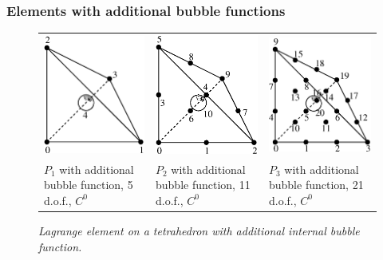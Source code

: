 \documentclass[11pt,a4paper]{article}
\begin{document}
\subsubsection{Elements with additional bubble functions}
\begin{figure}[H]
  \begin{center}
    \begin{tabular}{m{5cm}m{5cm}m{5cm}}
      \includegraphics[width=4.5cm,angle=0]{getfemlist_tetrahedron_P1_bubble.eps} & \includegraphics[width=4.5cm,angle=0]{getfemlist_tetrahedron_P2_bubble.eps} & \includegraphics[width=4.5cm,angle=0]{getfemlist_tetrahedron_P3_bubble.eps}  \\
      $P_1$ with additional bubble function, 5 d.o.f., $C^0$ & $P_2$ with additional bubble function, 11 d.o.f., $C^0$ & $P_3$ with additional bubble function, 21 d.o.f., $C^0$
    \end{tabular}
  \end{center}
  \caption{ \it Lagrange element on a tetrahedron with additional internal bubble function.} 
  \label{fig:tetrahedron_p1_bubble}
\end{figure}
\end{document}
